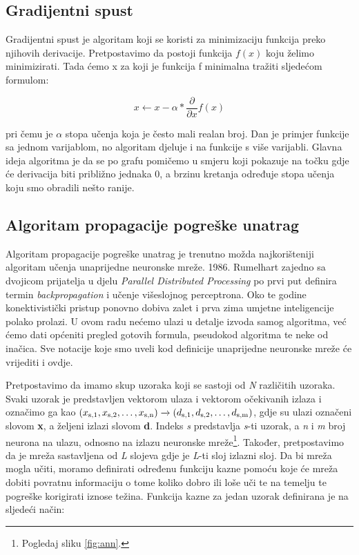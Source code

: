 \documentclass[times, utf8, zavrsni]{fer}
\begin{document}
\subsection{Gradijentni spust}
Gradijentni spust  je algoritam koji se koristi za minimizaciju funkcija preko njihovih derivacije. Pretpostavimo da postoji funkcija $f(x)$ koju želimo minimizirati. Tada ćemo x za koji je funkcija f minimalna tražiti sljedećom formulom:

\begin{equation}
    \label{eq:grad}
    x \leftarrow x - \alpha * \frac{\partial}{\partial x}f(x)
\end{equation}

pri čemu je $\alpha$ stopa učenja koja je često mali realan broj. Dan je primjer funkcije sa jednom varijablom, no algoritam djeluje i na funkcije s više varijabli. Glavna ideja algoritma je da se po grafu pomičemo u smjeru koji pokazuje na točku gdje će derivacija biti približno jednaka 0, a brzinu kretanja određuje stopa učenja koju smo obradili nešto ranije.

\subsection{Algoritam propagacije pogreške unatrag}
Algoritam propagacije pogreške unatrag  je trenutno možda najkorišteniji algoritam učenja unaprijedne neuronske mreže. 1986. Rumelhart zajedno sa dvojicom prijatelja u djelu \textit{Parallel Distributed Processing} po prvi put definira termin \textit{backpropagation} i učenje višeslojnog perceptrona. Oko te godine konektivistički pristup ponovno dobiva zalet i prva zima umjetne inteligencije polako prolazi. U ovom radu nećemo ulazi u detalje izvoda samog algoritma, već ćemo dati općeniti pregled gotovih formula, pseudokod algoritma te neke od inačica. Sve notacije koje smo uveli kod definicije unaprijedne neuronske mreže će vrijediti i ovdje.

Pretpostavimo da imamo skup uzoraka koji se sastoji od \textit{N} različitih uzoraka. Svaki uzorak je predstavljen vektorom ulaza i vektorom očekivanih izlaza i označimo ga kao $(x\textsubscript{s,1}, x\textsubscript{s,2},\dots, x\textsubscript{s,n}) \xrightarrow{} (d\textsubscript{s,1}, d\textsubscript{s,2},\dots, d\textsubscript{s,m})$, gdje su ulazi označeni slovom \textbf{x}, a željeni izlazi slovom \textbf{d}. Indeks \textit{s} predstavlja \textit{s}-ti uzorak, a \textit{n} i \textit{m} broj neurona na ulazu, odnosno na izlazu neuronske mreže\footnote{Pogledaj sliku \ref{fig:ann}.}. Također, pretpostavimo da je mreža sastavljena od \textit{L} slojeva gdje je \textit{L}-ti sloj izlazni sloj. Da bi mreža mogla učiti, moramo definirati određenu funkciju kazne pomoću koje će mreža dobiti povratnu informaciju o tome koliko dobro ili loše uči te na temelju te pogreške korigirati iznose težina. Funkcija kazne za jedan uzorak definirana je na sljedeći način:
\end{document}
